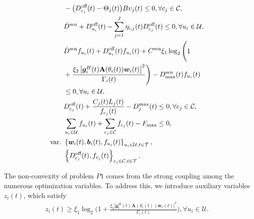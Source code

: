 \documentclass[10pt,journal,compsoc]{IEEEtran}
\begin{document}
\begin{align}
    & - \big(D_{c_{j}}^{\text{off}}(t) - \Theta_j(t)\big)B \upsilon_j(t) \le 0, \forall c_{j} \in \mathcal{C}, \label{P1:CUs-task-successful-offloading} \\
    & \bar{D}^{\text{sen}} + D_{u_{i}}^{\text{off}}(t) - \sum_{j = 1}^{J} \eta_{i, j}(t)D_{c_{j}}^{\text{off}}(t) \le 0, \forall u_{i} \in \mathcal{U}, \label{P1:Task-Fresh}  \\ 
    & \bar{D}^{\text{sen}}f_{u_{i}}(t) + D_{u_{i}}^{\text{off}}(t)f_{u_{i}}(t) + C^{\text{sen}} \xi_{1} \log_2 \Bigg(1 \notag \\
    & + \frac{\xi_{2} \left|\bm{g}^{H}_{i}(t)\mathbf{A}(\theta_{i}(t)) \bm{w}_{i}(t)\right|^{2}}{\Gamma_{i}(t)}\Bigg) - D^{\text{sen}}_{\max}(t)f_{u_{i}}(t)\notag \\
    & \le 0, \forall u_{i} \in \mathcal{U}, \label{P1:UAV-task-delay} \\
    & D_{c_{j}}^{\text{off}}(t) + \frac{C_{{j}}(t)L_{j}(t)}{f_{c_{j}}(t)} - D^{\max}_{{j}}(t) \le 0, \forall c_{j} \in \mathcal{C}, \label{P1:CU-task-delay} \\
    & \sum_{u_{i} \in \mathcal{U}}f_{u_{i}}(t) + \sum_{c_{j} \in \mathcal{C}}f_{c_{j}}(t) - F_{\max} \le 0, \label{P1:BS-Max-Frequency} \\
    \text{var.}\,\, & \left\{\bm{w}_{i}(t), \bm{b}_{i}(t), f_{u_{i}}(t)\right\}_{u_{i} \in \mathcal{U}, t \in \mathcal{T}}, \notag \\
    & \left\{D_{c_{j}}^{\text{off}}(t), f_{c_{j}}(t)\right\}_{c_{j} \in \mathcal{C}, t \in \mathcal{T}}.  \notag
\end{align}

The non-convexity of problem $P1$ comes from the strong coupling among the numerous optimization variables. 
To address this, we introduce auxiliary variables $z_{i}(t)$, which satisfy
\begin{align}\label{tempP2:Auxiliary-Variable-1}
    z_{i}(t) \ge \xi_{1} \log_2 \Bigg(1 + \frac{\xi_{2} \left|\bm{g}^{H}_{i}(t)\mathbf{A}(\theta_{i}(t)) \bm{w}_{i}(t)\right|^{2}}{\Gamma_{i}(t)}\Bigg), \forall u_{i} \in \mathcal{U}.
\end{align}
\end{document}
